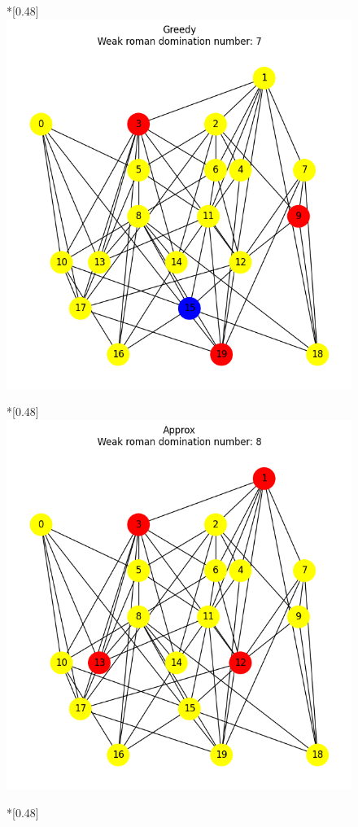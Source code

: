 \begin{figure}[htbp]
        \hfill
        \begin{subcaptionbox}*{}[0.48\linewidth]
            {\includegraphics[width=0.75\linewidth]{assets/plots/Greedy/ErdosRenyi_sparse_n20_i2_results.png}}
        \end{subcaptionbox}
        \hfill
        \begin{subcaptionbox}*{}[0.48\linewidth]
            {\includegraphics[width=0.75\linewidth]{assets/plots/Approx/ErdosRenyi_sparse_n20_i2_results.png}}
        \end{subcaptionbox}
        \hfill
        \begin{subcaptionbox}*{}[0.48\linewidth]

\end{subcaptionbox}
\end{figure}
